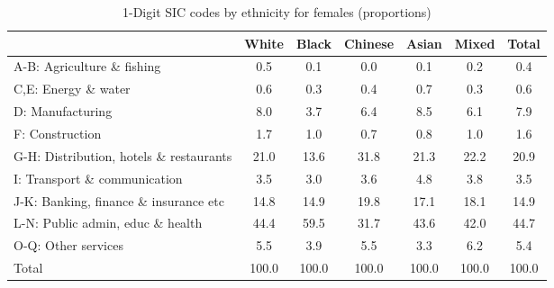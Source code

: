 \begin{table}[htbp]\centering
\def\sym#1{\ifmmode^{#1}\else\(^{#1}\)\fi}
\caption{1-Digit SIC codes by ethnicity for females (proportions)}
\begin{tabular}{l*{6}{c}}
\hline\hline
          &    White&    Black&  Chinese&    Asian&    Mixed&    Total\\
\hline
A-B: Agriculture \& fishing&      0.5&      0.1&      0.0&      0.1&      0.2&      0.4\\
C,E: Energy \& water&      0.6&      0.3&      0.4&      0.7&      0.3&      0.6\\
D: Manufacturing&      8.0&      3.7&      6.4&      8.5&      6.1&      7.9\\
F: Construction&      1.7&      1.0&      0.7&      0.8&      1.0&      1.6\\
G-H: Distribution, hotels \& restaurants&     21.0&     13.6&     31.8&     21.3&     22.2&     20.9\\
I: Transport \& communication&      3.5&      3.0&      3.6&      4.8&      3.8&      3.5\\
J-K: Banking, finance \& insurance etc&     14.8&     14.9&     19.8&     17.1&     18.1&     14.9\\
L-N: Public admin, educ \& health&     44.4&     59.5&     31.7&     43.6&     42.0&     44.7\\
O-Q: Other services&      5.5&      3.9&      5.5&      3.3&      6.2&      5.4\\
Total     &    100.0&    100.0&    100.0&    100.0&    100.0&    100.0\\
\hline\hline
\end{tabular}
\label{tab:1D_industries_female}
\end{table}
